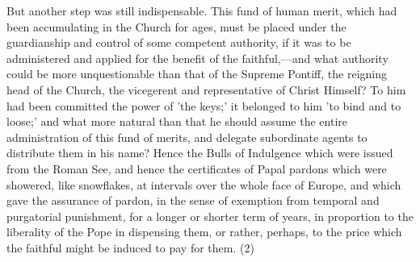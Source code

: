 \documentclass[
]{book}
\begin{document}
But another step was still indispensable. This fund of human merit, which had been accumulating in the Church for ages, must be placed under the guardianship and control of some competent authority, if it was to be administered and applied for the benefit of the faithful,---and what authority could be more unquestionable than that of the Supreme Pontiff, the reigning head of the Church, the vicegerent and representative of Christ Himself? To him had been committed the power of 'the keys;' it belonged to him 'to bind and to loose;' and what more natural than that he should assume the entire administration of this fund of merits, and delegate subordinate agents to distribute them in his name? Hence the Bulls of Indulgence which were issued from the Roman See, and hence the certificates of Papal pardons which were showered, like snowflakes, at intervals over the whole face of Europe, and which gave the assurance of pardon, in the sense of exemption from temporal and purgatorial punishment, for a longer or shorter term of years, in proportion to the liberality of the Pope in dispensing them, or rather, perhaps, to the price which the faithful might be induced to pay for them. (2)
\end{document}
